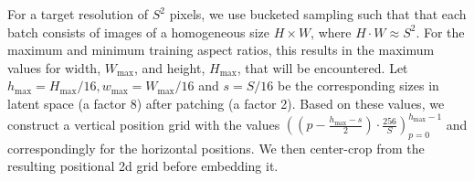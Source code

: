 %
%
%
%
%
%
%
%
%
%

For a target resolution of $S^2$ pixels, we use bucketed sampling
\cite{novelai,podell2023sdxl} such that
that each batch consists of images of a homogeneous size $H \times W$, where $H \cdot W
\approx S^2$.
For the maximum and minimum training aspect ratios,
this results in the maximum values for width, $W_\text{max}$, and height,
$H_\text{max}$, that will be encountered. Let $h_\text{max}=H_\text{max}/16, w_\text{max}=W_\text{max}/16$ and $s=S/16$ be the corresponding sizes in latent space (a factor 8) after patching (a factor 2).
Based on these values, we construct a vertical position
grid with the values
$((p-\frac{h_\text{max}-s}{2})\cdot\frac{256}{S})_{p=0}^{{h_\text{max}-1}}$
and correspondingly for the horizontal positions. We then
center-crop from the resulting positional 2d grid before embedding it.

\figtimeshift

